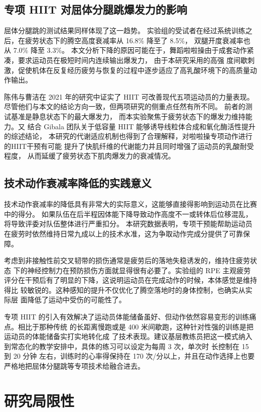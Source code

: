 \documentclass[a4paper,12pt]{article}
\begin{document}
\subsection{专项 HIIT 对屈体分腿跳爆发力的影响}

屈体分腿跳的测试结果同样体现了这一趋势。
实验组的受试者在经过系统训练之后，在疲劳状态下的腾空高度衰减率从 16.8\% 降至了 8.5\%，
双腿开度衰减率也从 7.0\% 降至 3.3\%。
本文分析下降的原因可能在于，舞蹈啦啦操由于成套动作紧凑，要求运动员在极短时间内连续输出爆发力，
由于本研究采用的高强
度间歇刺激，促使机体在反复经历疲劳与恢复的过程中逐步适应了高乳酸环境下的高质量动作输出。

陈伟与曹洁在 2021 年的研究中证实了 HIIT 可改善现代五项运动员的力量表现\cite{chen2021}。
尽管他们与本文的结论方向一致，但两项研究的侧重点任然有所不同。
前者的测试基准是静息状态下的最大爆发力，
而本实验聚焦于疲劳状态下的爆发力维持能力。又
结合 Gibala 团队关于低容量 HIIT 能够诱导线粒体合成和氧化酶活性提升的综述结论\cite{gibala2012}，
本研究的代谢适应机制也得到了合理解释，对啦啦操专项动作进行的HIIT干预有可能
提升了快肌纤维的代谢能力并且同时增强了运动员的乳酸耐受程度，
从而延缓了疲劳状态下肌肉爆发力的衰减情况。

\subsection{技术动作衰减率降低的实践意义}

技术动作衰减率的降低具有非常大的实际意义，这能够直接得影响到运动员在比赛中的得分。
如果队伍在后半程因体能下降导致动作高度不一或转体后位移混乱，将导致评委对队伍整体进行严重扣分。
本研究数据表明，专项干预能帮助运动员在疲劳时依然维持日常九成以上的技术水准，这为争取动作完成分提供了可靠保障。

考虑到非接触性前交叉韧带的损伤通常是疲劳后的落地失稳诱发的，维持住疲劳状态
下的神经控制力在预防损伤方面就显得很有必要了。实验组的 RPE 主观疲劳评分在干预后有了明显的下降，这说明运动员在完成动作的时候，本体感觉是维持得比
较敏锐的。这种感知的提升不仅优化了腾空落地时的身体控制，也确实从实际层
面降低了运动中受伤的可能性了。

专项 HIIT 的引入有效解决了运动员体能储备虽好、但动作依然容易变形的训练痛点。相比于那种传统
的长距离慢跑或是 400 米间歇跑，这种针对性强的训练是把运动员的体能储备实打实地转化成
了技术表现。建议基层教练员把这一模式纳入到常态化的教学安排中，具体的练习可以设定为每周 3 次，单次时
长控制在 15 到 20 分钟
左右，训练时的心率得保持在 170 次/分以上，并且在动作选择上也要严格地把屈体分腿跳等专项技术给融合进去。
\section{研究局限性}
\end{document}
